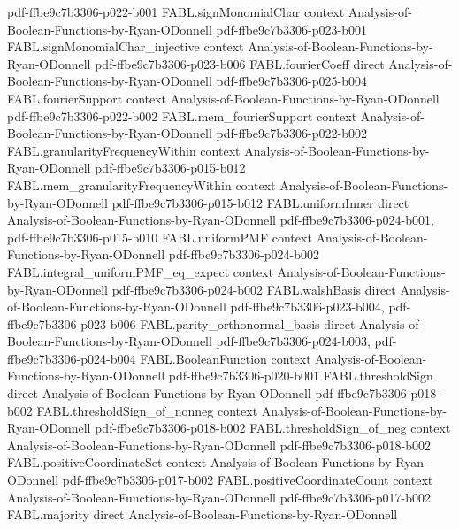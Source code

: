 \begin{theorem}
{    pdf-ffbe9c7b3306-p022-b001}
\proofstep
  {FABL.signMonomialChar}
  {context}
  {Analysis-of-Boolean-Functions-by-Ryan-ODonnell}
  {pdf-ffbe9c7b3306-p023-b001}
\proofstep
  {FABL.signMonomialChar_injective}
  {context}
  {Analysis-of-Boolean-Functions-by-Ryan-ODonnell}
  {pdf-ffbe9c7b3306-p023-b006}
\proofstep
  {FABL.fourierCoeff}
  {direct}
  {Analysis-of-Boolean-Functions-by-Ryan-ODonnell}
  {pdf-ffbe9c7b3306-p025-b004}
\proofstep
  {FABL.fourierSupport}
  {context}
  {Analysis-of-Boolean-Functions-by-Ryan-ODonnell}
  {pdf-ffbe9c7b3306-p022-b002}
\proofstep
  {FABL.mem_fourierSupport}
  {context}
  {Analysis-of-Boolean-Functions-by-Ryan-ODonnell}
  {pdf-ffbe9c7b3306-p022-b002}
\proofstep
  {FABL.granularityFrequencyWithin}
  {context}
  {Analysis-of-Boolean-Functions-by-Ryan-ODonnell}
  {pdf-ffbe9c7b3306-p015-b012}
\proofstep
  {FABL.mem_granularityFrequencyWithin}
  {context}
  {Analysis-of-Boolean-Functions-by-Ryan-ODonnell}
  {pdf-ffbe9c7b3306-p015-b012}
\proofstep
  {FABL.uniformInner}
  {direct}
  {Analysis-of-Boolean-Functions-by-Ryan-ODonnell}
  {pdf-ffbe9c7b3306-p024-b001,
    pdf-ffbe9c7b3306-p015-b010}
\proofstep
  {FABL.uniformPMF}
  {context}
  {Analysis-of-Boolean-Functions-by-Ryan-ODonnell}
  {pdf-ffbe9c7b3306-p024-b002}
\proofstep
  {FABL.integral_uniformPMF_eq_expect}
  {context}
  {Analysis-of-Boolean-Functions-by-Ryan-ODonnell}
  {pdf-ffbe9c7b3306-p024-b002}
\proofstep
  {FABL.walshBasis}
  {direct}
  {Analysis-of-Boolean-Functions-by-Ryan-ODonnell}
  {pdf-ffbe9c7b3306-p023-b004,
    pdf-ffbe9c7b3306-p023-b006}
\proofstep
  {FABL.parity_orthonormal_basis}
  {direct}
  {Analysis-of-Boolean-Functions-by-Ryan-ODonnell}
  {pdf-ffbe9c7b3306-p024-b003,
    pdf-ffbe9c7b3306-p024-b004}
\proofstep
  {FABL.BooleanFunction}
  {context}
  {Analysis-of-Boolean-Functions-by-Ryan-ODonnell}
  {pdf-ffbe9c7b3306-p020-b001}
\proofstep
  {FABL.thresholdSign}
  {direct}
  {Analysis-of-Boolean-Functions-by-Ryan-ODonnell}
  {pdf-ffbe9c7b3306-p018-b002}
\proofstep
  {FABL.thresholdSign_of_nonneg}
  {context}
  {Analysis-of-Boolean-Functions-by-Ryan-ODonnell}
  {pdf-ffbe9c7b3306-p018-b002}
\proofstep
  {FABL.thresholdSign_of_neg}
  {context}
  {Analysis-of-Boolean-Functions-by-Ryan-ODonnell}
  {pdf-ffbe9c7b3306-p018-b002}
\proofstep
  {FABL.positiveCoordinateSet}
  {context}
  {Analysis-of-Boolean-Functions-by-Ryan-ODonnell}
  {pdf-ffbe9c7b3306-p017-b002}
\proofstep
  {FABL.positiveCoordinateCount}
  {context}
  {Analysis-of-Boolean-Functions-by-Ryan-ODonnell}
  {pdf-ffbe9c7b3306-p017-b002}
\proofstep
  {FABL.majority}
  {direct}
  {Analysis-of-Boolean-Functions-by-Ryan-ODonnell}

\end{theorem}
